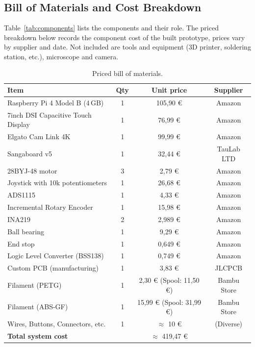 \subsection{Bill of Materials and Cost Breakdown}\label{app:bom}

Table~\ref{tab:components} lists the components and their role. The priced breakdown below records the component cost of the built prototype, prices vary by supplier and date. Not included are tools and equipment (3D printer, soldering station, etc.), microscope and camera.

\begin{table}[H]
    \centering
    \caption[Priced bill of materials]{Priced bill of materials.}
    \label{tab:bom-priced}
    \begin{tabular}{@{}L{5.8cm} c c c@{}}
        \toprule
        \textbf{Item} & \textbf{Qty} & \textbf{Unit price} & \textbf{Supplier} \\
        \midrule
        Raspberry Pi 4 Model B (4\,GB) & 1 & 105,90 \euro & Amazon \\
        7inch DSI Capacitive Touch Display & 1 & 76,99 \euro & Amazon \\
        Elgato Cam Link 4K & 1 & 99,99 \euro & Amazon \\
        Sangaboard v5 & 1 & 32,44 \euro & TauLab LTD \\
        28BYJ-48 motor & 3 & 2,79 \euro & Amazon \\
        Joystick with 10k potentiometers & 1 & 26,68 \euro & Amazon \\
        ADS1115 & 1 & 4,33 \euro & Amazon \\
        Incremental Rotary Encoder & 1 & 15,98 \euro & Amazon \\
        INA219 & 2 & 2,989 \euro & Amazon \\
        Ball bearing & 1 & 9,29 \euro & Amazon \\
        End stop & 1 & 0,649 \euro & Amazon \\
        Logic Level Converter (BSS138) & 1 & 0,749 \euro & Amazon \\
        Custom PCB (manufacturing) & 1 & 3,83 \euro & JLCPCB \\
        Filament (PETG) & 1 & 2,30 \euro \hspace{0.01cm} (Spool: 11,50 \euro) & Bambu Store \\
        Filament (ABS-GF) & 1 & 15,99 \euro \hspace{0.01cm} (Spool: 31,99 \euro) & Bambu Store \\
        Wires, Buttons, Connectors, etc. & 1 & \(\approx\) 10 \euro & (Diverse) \\
        \midrule
        \textbf{Total system cost} & & \(\approx\) 419,47 \euro & \\
        \bottomrule
    \end{tabular}
\end{table}

